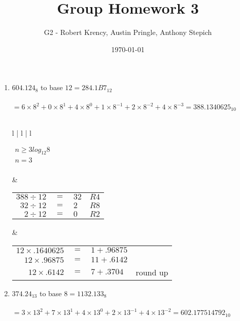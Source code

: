 \documentclass[12pt]{article}
\title{Group Homework 3}
\author{G2 - Robert Krency, Austin Pringle, Anthony Stepich}
\date{\today}
\begin{document}
\maketitle

\begin{enumerate}

     \item $604.124_{8}$ to base $12 = \boxed{284.1B7_{12}}$ \\ \\
     $ = 6 \times 8^2 + 0 \times 8^1 + 4 \times 8^0 + 1 \times 8^{-1} + 2 \times 8^{-2} + 4 \times 8^{-3} = 388.1340625_{10}$ \\\\
     \begin{tabular}{l | l | l}
         

        $\begin{aligned}
            n \geq 3log_{12}8 \\
            n = 3 \\
        \end{aligned}$

        &

        \begin{tabular}{r c l l}
            $388 \div 12$ & $=$ & $32$ & $R4$ \\
            $32 \div 12$  & $=$ & $2$ & $R8$  \\
            $2 \div 12$   & $=$ & $0$ & $R2$  \\
        \end{tabular}

        &

        \begin{tabular}{r c l l}
            $12 \times .1640625$ & $=$ & $1 + .96875$ & \\
            $12 \times .96875$ & $=$ & $11 + .6142$ & \\
            $12 \times .6142$ & $=$ & $7 + .3704$ & round up \\
        \end{tabular}
        

     \end{tabular}

     \item $374.24_{13}$ to base $8 = \boxed{1132.133_{8}}$ \\ \\
     $ = 3 \times 13^2 + 7 \times 13^1 + 4 \times 13^0 + 2 \times 13^{-1} + 4 \times 13^{-2} = 602.177514792_{10}$ \\\\
     \begin{tabular}{l | l | l}
         


\end{tabular}
\end{enumerate}
\end{document}
